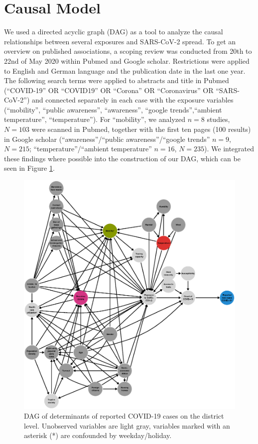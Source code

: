 \documentclass[]{elsarticle} %
\makeatletter
\def\maxwidth{\ifdim\Gin@nat@width>\linewidth\linewidth
\else\Gin@nat@width\fi}
\let\Oldincludegraphics\includegraphics
\renewcommand{\includegraphics}[1]{\Oldincludegraphics[width=\maxwidth]{#1}}
\makeatother
\begin{document}
\section{Causal Model}\label{causal-model}

We used a directed acyclic graph (DAG)
\citep{schipf_directed_2011, textor_robust_2017} as a tool to analyze
the causal relationships between several exposures and SARS-CoV-2
spread. To get an overview on published associations, a scoping review
was conducted from 20th to 22nd of May 2020 within Pubmed and Google
scholar. Restrictions were applied to English and German language and
the publication date in the last one year. The following search terms
were applied to abstracts and title in Pubmed (``COVID-19'' OR
``COVID19'' OR ``Corona'' OR ``Coronavirus'' OR ``SARS-CoV-2'') and
connected separately in each case with the exposure variables
(``mobility'', ``public awareness'', ``awareness'', ``google
trends'',``ambient temperature'', ``temperature''). For ``mobility'', we
analyzed \(n=8\) studies, \(N=103\) were scanned in Pubmed, together
with the first ten pages (100 results) in Google scholar
(``awareness''/``public awareness''/``google trends'' \(n=9\),
\(N=215\); ``temperature''/``ambient temperature'' \(n=16\), \(N=235\)).
We integrated these findings where possible into the construction of our
DAG, which can be seen in Figure \ref{fig:dag-covid-19}.

\begin{figure}
\centering
\includegraphics{figures/f_full_covid19_dag.eps}
\caption{\label{fig:dag-covid-19}DAG of determinants of reported COVID-19
cases on the district level. Unobserved variables are light gray,
variables marked with an asterisk (*) are confounded by
weekday/holiday.}
\end{figure}
\end{document}

